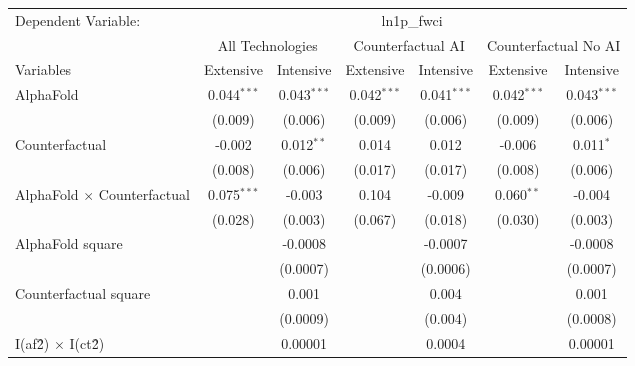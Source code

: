 \begingroup
\centering
\begin{tabular}{lcccccc}
   \tabularnewline \midrule \midrule
   Dependent Variable: & \multicolumn{6}{c}{ln1p\_fwci}\\
 & \multicolumn{2}{c}{All Technologies} & \multicolumn{2}{c}{Counterfactual AI} & \multicolumn{2}{c}{Counterfactual No AI} \\
\cmidrule(lr){1-1}\cmidrule(lr){2-3} \cmidrule(lr){4-5} \cmidrule(lr){6-7}
Variables & \multicolumn{1}{c}{Extensive} & \multicolumn{1}{c}{Intensive} & \multicolumn{1}{c}{Extensive} & \multicolumn{1}{c}{Intensive} & \multicolumn{1}{c}{Extensive} & \multicolumn{1}{c}{Intensive} \\
\cmidrule(lr){1-1}\cmidrule(lr){2-2} \cmidrule(lr){3-3} \cmidrule(lr){4-4} \cmidrule(lr){5-5} \cmidrule(lr){6-6} \cmidrule(lr){7-7}
   AlphaFold                          & 0.044$^{***}$ & 0.043$^{***}$ & 0.042$^{***}$ & 0.041$^{***}$ & 0.042$^{***}$ & 0.043$^{***}$\\   
                                      & (0.009)       & (0.006)       & (0.009)       & (0.006)       & (0.009)       & (0.006)\\   
   Counterfactual                     & -0.002        & 0.012$^{**}$  & 0.014         & 0.012         & -0.006        & 0.011$^{*}$\\   
                                      & (0.008)       & (0.006)       & (0.017)       & (0.017)       & (0.008)       & (0.006)\\   
   AlphaFold $\times$ Counterfactual  & 0.075$^{***}$ & -0.003        & 0.104         & -0.009        & 0.060$^{**}$  & -0.004\\   
                                      & (0.028)       & (0.003)       & (0.067)       & (0.018)       & (0.030)       & (0.003)\\   
   AlphaFold square                   &               & -0.0008       &               & -0.0007       &               & -0.0008\\   
                                      &               & (0.0007)      &               & (0.0006)      &               & (0.0007)\\   
   Counterfactual square              &               & 0.001         &               & 0.004         &               & 0.001\\   
                                      &               & (0.0009)      &               & (0.004)       &               & (0.0008)\\   
   I(af\^2) $\times$ I(ct\^2)         &               & 0.00001       &               & 0.0004        &               & 0.00001\\   

\end{tabular}
